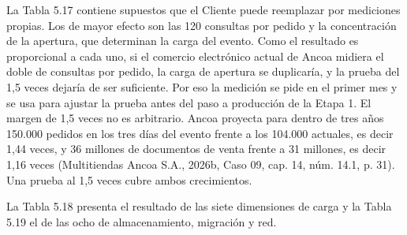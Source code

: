 \documentclass[11pt]{article}
\begin{document}
La Tabla 5.17 contiene supuestos que el Cliente puede reemplazar por mediciones propias. Los de mayor efecto son las 120 consultas por pedido y la concentración de la apertura, que determinan la carga del evento. Como el resultado es proporcional a cada uno, si el comercio electrónico actual de Ancoa midiera el doble de consultas por pedido, la carga de apertura se duplicaría, y la prueba del 1,5 veces dejaría de ser suficiente. Por eso la medición se pide en el primer mes y se usa para ajustar la prueba antes del paso a producción de la Etapa 1. El margen de 1,5 veces no es arbitrario. Ancoa proyecta para dentro de tres años 150.000 pedidos en los tres días del evento frente a los 104.000 actuales, es decir 1,44 veces, y 36 millones de documentos de venta frente a 31 millones, es decir 1,16 veces (Multitiendas Ancoa S.A., 2026b, Caso 09, cap. 14, núm. 14.1, p. 31). Una prueba al 1,5 veces cubre ambos crecimientos.

La Tabla 5.18 presenta el resultado de las siete dimensiones de carga y la Tabla 5.19 el de las ocho de almacenamiento, migración y red.
\end{document}
